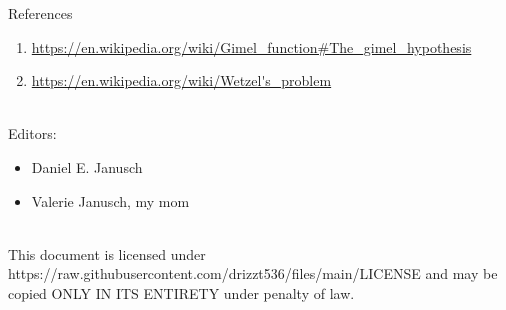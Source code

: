 \documentclass[12pt]{article}
\begin{document}
\begin{section}{References}
\begin{enumerate}
		\item\url{https://en.wikipedia.org/wiki/Gimel\_function\#The\_gimel\_hypothesis}\\
		\label{ref:gimel}

		\item\url{https://en.wikipedia.org/wiki/Wetzel's\_problem}\\
		\label{ref:wetzel}
	\end{enumerate}\\
	Editors:
	\begin{itemize}
		\item Daniel E. Janusch
		\item Valerie Janusch, my mom
	\end{itemize}
	\vspace{6em}\\
	This document is licensed under https://raw.githubusercontent.com/drizzt536/files/main/LICENSE
	and may be copied ONLY IN ITS ENTIRETY under penalty of law.
\end{section}
\end{document}
